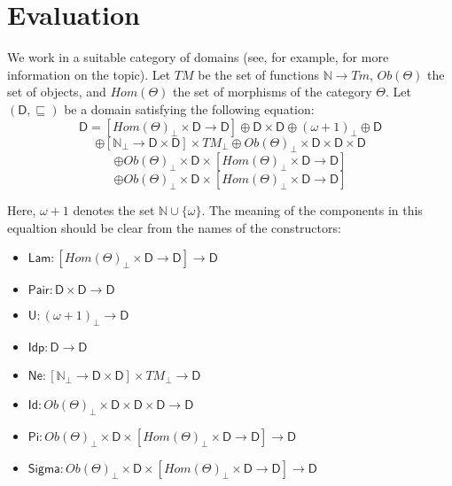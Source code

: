 \documentclass{amsart}
\theoremstyle{definition}
\theoremstyle{remark}
\newcommand{\D}{\mathsf{D}}
\newcommand{\nats}{\mathbb{N}}
\numberwithin{table}{section}
\begin{document}
\section{Evaluation}
\label{sec:eval}

We work in a suitable category of domains (see, for example, \cite{domains} for more information on the topic).
Let $TM$ be the set of functions $\nats \to Tm$, $Ob(\Theta)$ the set of objects, and $Hom(\Theta)$ the set of morphisms of the category $\Theta$.
Let $(\D,\sqsubseteq)$ be a domain satisfying the following equation:
\[ \D = [Hom(\Theta)_\bot \times \D \to \D] \oplus \D \times \D \oplus (\omega + 1)_\bot \oplus \D \]
\[ \oplus [\nats_\bot \to \D \times \D] \times TM_\bot \oplus Ob(\Theta)_\bot \times \D \times \D \times \D \]
\[ \oplus Ob(\Theta)_\bot \times \D \times [Hom(\Theta)_\bot \times \D \to \D] \]
\[ \oplus Ob(\Theta)_\bot \times \D \times [Hom(\Theta)_\bot \times \D \to \D] \]

Here, $\omega + 1$ denotes the set $\nats \cup \{ \omega \}$.
The meaning of the components in this equaltion should be clear from the names of the constructors:
\begin{itemize}
\item[] $\mathsf{Lam} : [Hom(\Theta)_\bot \times \D \to \D] \to \D$
\item[] $\mathsf{Pair} : \D \times \D \to \D$
\item[] $\mathsf{U} : (\omega + 1)_\bot \to \D$
\item[] $\mathsf{Idp} : \D \to \D$
\item[] $\mathsf{Ne} : [\nats_\bot \to \D \times \D] \times TM_\bot \to \D$
\item[] $\mathsf{Id} : Ob(\Theta)_\bot \times \D \times \D \times \D \to \D$
\item[] $\mathsf{Pi} : Ob(\Theta)_\bot \times \D \times [Hom(\Theta)_\bot \times \D \to \D] \to \D$
\item[] $\mathsf{Sigma} : Ob(\Theta)_\bot \times \D \times [Hom(\Theta)_\bot \times \D \to \D] \to \D$
\end{itemize}
\end{document}
